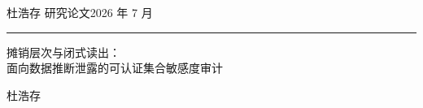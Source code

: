 \documentclass[10.5pt,compsoc,UTF8]{CjC}
\theoremstyle{mystyle}
\begin{document}
\thispagestyle{plain}%
\thispagestyle{empty}%
\pagestyle{CjCheadings}

\vspace {-13mm}
\onecolumn
{}\noindent 杜浩存 \hfill 研究论文\hfill 2026 年 7 月\\
\noindent\rule[0.25\baselineskip]{\textwidth}{1pt}

{
\centering
\vspace {11mm}
{ \heiti 摊销层次与闭式读出：\\面向数据推断泄露的可认证集合敏感度审计}

\vskip 5mm

{\fangsong 杜浩存}

\vspace {5mm}

}

\vspace {8mm}
\end{document}
